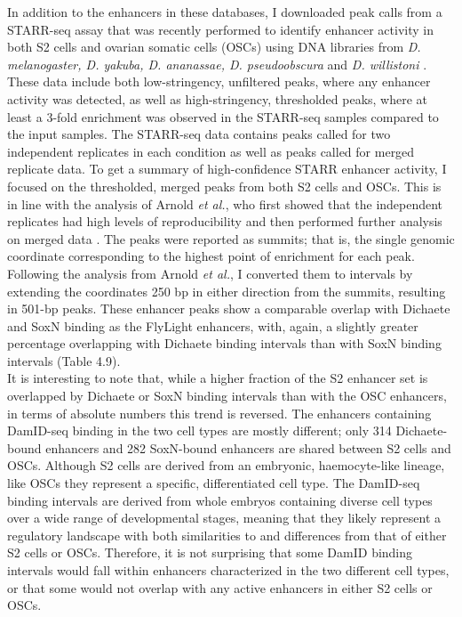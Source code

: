 In addition to the enhancers in these databases, I downloaded peak calls from a STARR-seq assay that was recently performed to identify enhancer activity in both S2 cells and ovarian somatic cells (OSCs) using DNA libraries from \emph{D. melanogaster, D. yakuba, D. ananassae, D. pseudoobscura} and \emph{D. willistoni} \citep{arnold_quantitative_2014}. These data include both low-stringency, unfiltered peaks, where any enhancer activity was detected, as well as high-stringency, thresholded peaks, where at least a 3-fold enrichment was observed in the STARR-seq samples compared to the input samples. The STARR-seq data contains peaks called for two independent replicates in each condition as well as peaks called for merged replicate data. To get a summary of high-confidence STARR enhancer activity, I focused on the thresholded, merged peaks from both S2 cells and OSCs. This is in line with the analysis of Arnold \emph{et al.}, who first showed that the independent replicates had high levels of reproducibility and then performed further analysis on merged data \citet{arnold_quantitative_2014}. The peaks were reported as summits; that is, the single genomic coordinate corresponding to the highest point of enrichment for each peak. Following the analysis from Arnold \emph{et al.}, I converted them to intervals by extending the coordinates 250 bp in either direction from the summits, resulting in 501-bp peaks. These enhancer peaks show a comparable overlap with Dichaete and SoxN binding as the FlyLight enhancers, with, again, a slightly greater percentage overlapping with Dichaete binding intervals than with SoxN binding intervals (Table 4.9).\\

It is interesting to note that, while a higher fraction of the S2 enhancer set is overlapped by Dichaete or SoxN binding intervals than with the OSC enhancers, in terms of absolute numbers this trend is reversed. The enhancers containing DamID-seq binding in the two cell types are mostly different; only 314 Dichaete-bound enhancers and 282 SoxN-bound enhancers are shared between S2 cells and OSCs. Although S2 cells are derived from an embryonic, haemocyte-like lineage, like OSCs they represent a specific, differentiated cell type. The DamID-seq binding intervals are derived from whole embryos containing diverse cell types over a wide range of developmental stages, meaning that they likely represent a regulatory landscape with both similarities to and differences from that of either S2 cells or OSCs. Therefore, it is not surprising that some DamID binding intervals would fall within enhancers characterized in the two different cell types, or that some would not overlap with any active enhancers in either S2 cells or OSCs.\\

